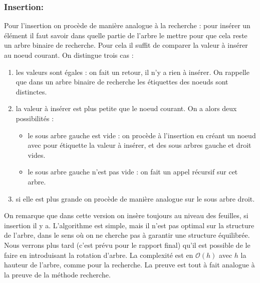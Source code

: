 \documentclass{report}
\begin{document}
\subsubsection{Insertion:}
Pour l'insertion on procède de manière analogue à la recherche : pour insérer un élément il faut savoir dans quelle partie de l'arbre le mettre pour que cela reste un arbre binaire de recherche.
Pour cela il suffit de comparer la valeur à insérer au noeud courant. On distingue trois cas :
\begin{enumerate}
    \item les valeurs sont égales : on fait un retour, il n'y a rien à insérer. On rappelle que dans un arbre binaire de recherche les étiquettes des noeuds sont distinctes.
    \item la valeur à insérer est plus petite que le noeud courant. On a alors deux possibilités :
    \begin{itemize}
        \item le sous arbre gauche est vide : on procède à l'insertion en créant un noeud avec pour étiquette la valeur à insérer, et des sous arbres gauche et droit vides.
        \item le sous arbre gauche n'est pas vide : on fait un appel récursif sur cet arbre.
    \end{itemize}
    \item si elle est plus grande on procède de manière analogue sur le sous arbre droit.
\end{enumerate}
On remarque que dans cette version on insère toujours au niveau des feuilles, si insertion il y a. L'algorithme est simple, mais il n'est pas optimal sur la structure de l'arbre, dans le sens où on ne cherche pas à garantir une structure équilibrée. Nous verrons plus tard (c'est prévu pour le rapport final) qu'il est possible de le faire en introduisant la rotation d'arbre.
La complexité est en $\mathcal{O}(h)$ avec $h$ la hauteur de l'arbre, comme pour la recherche. La preuve est tout à fait analogue à la preuve de la méthode recherche.
\end{document}
